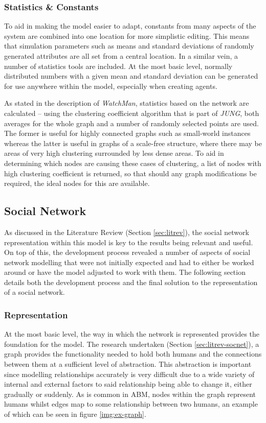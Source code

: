 \documentclass[]{report}
\begin{document}
\subsubsection{Statistics \& Constants}
To aid in making the model easier to adapt, constants from many aspects of the system are combined into one location for more simplistic editing. This means that simulation parameters such as means and standard deviations of randomly generated attributes are all set from a central location. In a similar vein, a number of statistics tools are included. At the most basic level, normally distributed numbers with a given mean and standard deviation can be generated for use anywhere within the model, especially when creating agents.

As stated in the description of \emph{WatchMan}, statistics based on the network are calculated – using the clustering coefficient algorithm that is part of \emph{JUNG}, both averages for the whole graph and a number of randomly selected points are used. The former is useful for highly connected graphs such as small-world instances whereas the latter is useful in graphs of a scale-free structure, where there may be areas of very high clustering surrounded by less dense areas. To aid in determining which nodes are causing these cases of clustering, a list of nodes with high clustering coefficient is returned, so that should any graph modifications be required, the ideal nodes for this are available.

\subsection{Social Network}
\label{sec:socnet}
As discussed in the Literature Review (Section \ref{sec:litrev}), the social network representation within this model is key to the results being relevant and useful. On top of this, the development process revealed a number of aspects of social network modelling that were not initially expected and had to either be worked around or have the model adjusted to work with them. The following section details both the development process and the final solution to the representation of a social network.

\subsubsection{Representation}

At the most basic level, the way in which the network is represented provides the foundation for the model. The research undertaken (Section \ref{sec:litrev-socnet}), a graph provides the functionality needed to hold both humans and the connections between them at a sufficient level of abstraction. This abstraction is important since modelling relationships accurately is very difficult due to a wide variety of internal and external factors to said relationship being able to change it, either gradually or suddenly. As is common in ABM, nodes within the graph represent humans whilst edges map to some relationship between two humans, an example of which can be seen in figure \ref{img:ex-graph}.
\end{document}
